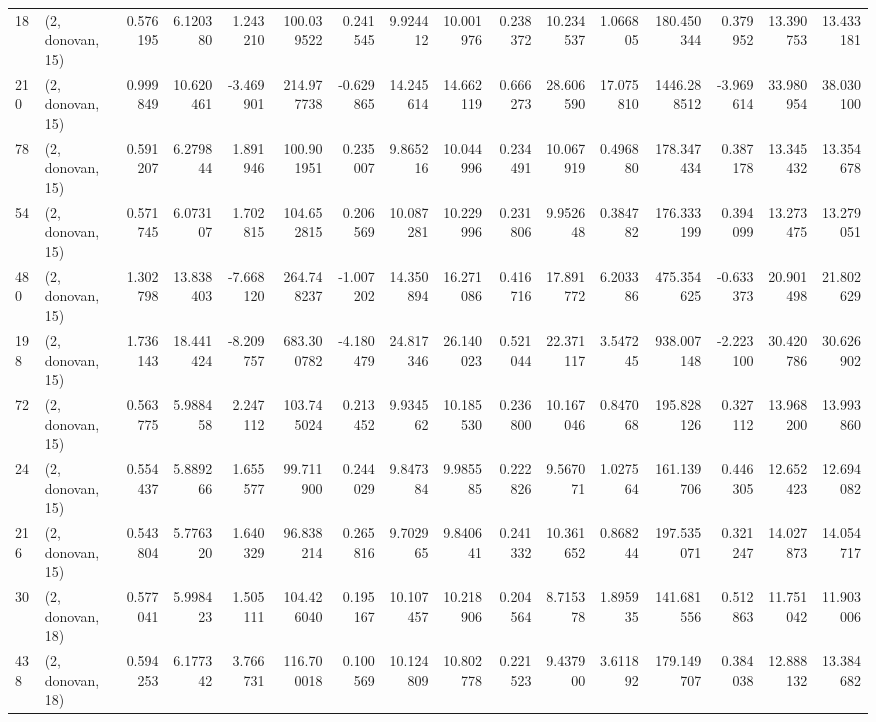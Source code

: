 \begin{tabular}{llrrrrrrrrrrrrrr}
18  &  (2, donovan, 15) &   0.576195 &   6.120380 &   1.243210 &   100.039522 &   0.241545 &   9.924412 &  10.001976 &  0.238372 &  10.234537 &   1.066805 &   180.450344 &   0.379952 &  13.390753 &  13.433181 \\
210 &  (2, donovan, 15) &   0.999849 &  10.620461 &  -3.469901 &   214.977738 &  -0.629865 &  14.245614 &  14.662119 &  0.666273 &  28.606590 &  17.075810 &  1446.288512 &  -3.969614 &  33.980954 &  38.030100 \\
78  &  (2, donovan, 15) &   0.591207 &   6.279844 &   1.891946 &   100.901951 &   0.235007 &   9.865216 &  10.044996 &  0.234491 &  10.067919 &   0.496880 &   178.347434 &   0.387178 &  13.345432 &  13.354678 \\
54  &  (2, donovan, 15) &   0.571745 &   6.073107 &   1.702815 &   104.652815 &   0.206569 &  10.087281 &  10.229996 &  0.231806 &   9.952648 &   0.384782 &   176.333199 &   0.394099 &  13.273475 &  13.279051 \\
480 &  (2, donovan, 15) &   1.302798 &  13.838403 &  -7.668120 &   264.748237 &  -1.007202 &  14.350894 &  16.271086 &  0.416716 &  17.891772 &   6.203386 &   475.354625 &  -0.633373 &  20.901498 &  21.802629 \\
198 &  (2, donovan, 15) &   1.736143 &  18.441424 &  -8.209757 &   683.300782 &  -4.180479 &  24.817346 &  26.140023 &  0.521044 &  22.371117 &   3.547245 &   938.007148 &  -2.223100 &  30.420786 &  30.626902 \\
72  &  (2, donovan, 15) &   0.563775 &   5.988458 &   2.247112 &   103.745024 &   0.213452 &   9.934562 &  10.185530 &  0.236800 &  10.167046 &   0.847068 &   195.828126 &   0.327112 &  13.968200 &  13.993860 \\
24  &  (2, donovan, 15) &   0.554437 &   5.889266 &   1.655577 &    99.711900 &   0.244029 &   9.847384 &   9.985585 &  0.222826 &   9.567071 &   1.027564 &   161.139706 &   0.446305 &  12.652423 &  12.694082 \\
216 &  (2, donovan, 15) &   0.543804 &   5.776320 &   1.640329 &    96.838214 &   0.265816 &   9.702965 &   9.840641 &  0.241332 &  10.361652 &   0.868244 &   197.535071 &   0.321247 &  14.027873 &  14.054717 \\
30  &  (2, donovan, 18) &   0.577041 &   5.998423 &   1.505111 &   104.426040 &   0.195167 &  10.107457 &  10.218906 &  0.204564 &   8.715378 &   1.895935 &   141.681556 &   0.512863 &  11.751042 &  11.903006 \\
438 &  (2, donovan, 18) &   0.594253 &   6.177342 &   3.766731 &   116.700018 &   0.100569 &  10.124809 &  10.802778 &  0.221523 &   9.437900 &   3.611892 &   179.149707 &   0.384038 &  12.888132 &  13.384682 \\

\end{tabular}
